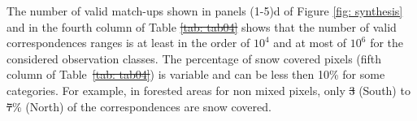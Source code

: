 \documentclass[tc, manuscript]{copernicus}
\providecommand{\DIFaddtex}[1]{{\protect\color{blue}\uwave{#1}}} %
\providecommand{\DIFdeltex}[1]{{\protect\color{red}\sout{#1}}}                      %
\providecommand{\DIFaddbegin}{} %
\providecommand{\DIFaddend}{} %
\providecommand{\DIFdelbegin}{} %
\providecommand{\DIFdelend}{} %
\providecommand{\DIFadd}[1]{\texorpdfstring{\DIFaddtex{#1}}{#1}} %
\providecommand{\DIFdel}[1]{\texorpdfstring{\DIFdeltex{#1}}{}} %
\begin{document}
The number of valid match-ups shown in panels (1-5)d of Figure \ref{fig: synthesis} and in the fourth column of Table \DIFdelbegin \DIFdel{\ref{tab: tab04} }\DIFdelend \DIFaddbegin \DIFadd{\ref{tab: tab05} }\DIFaddend shows that the number of valid correspondences ranges is at least in the order of $10^4$ and at most of $10^6$ for the considered observation classes. The percentage of snow covered pixels (fifth column of Table~\DIFdelbegin \DIFdel{\ref{tab: tab04}}\DIFdelend \DIFaddbegin \DIFadd{\ref{tab: tab05}}\DIFaddend ) is variable and can be less then 10\% for some categories. For example, in forested areas for non mixed pixels, only \DIFdelbegin \DIFdel{3 }\DIFdelend \DIFaddbegin \DIFadd{8 }\DIFaddend (South) to \DIFdelbegin \DIFdel{7}\DIFdelend \DIFaddbegin \DIFadd{18}\DIFaddend \% (North) of the correspondences are snow covered.
\end{document}

